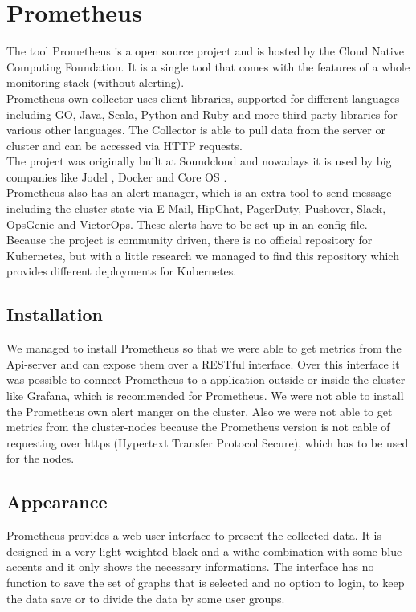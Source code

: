 \section{Prometheus}
\label{Prometheus} %
The tool Prometheus is a open source project and is hosted by the Cloud Native Computing Foundation.
It is a single tool that comes with the features of a whole monitoring stack (without alerting).\\ Prometheus own collector uses client libraries, supported for different languages including GO, Java, Scala, Python and Ruby and more third-party libraries for various other languages. The Collector is able to pull data from the server or cluster and can be accessed via HTTP requests.\\
The project was originally built at Soundcloud and nowadays it is used by big companies like Jodel \cite{jodel}, Docker and Core OS \cite{prometeus}. \\
Prometheus also has an alert manager, which is an extra tool to send message including the cluster state via E-Mail, HipChat, PagerDuty, Pushover, Slack, OpsGenie and VictorOps. These alerts have to be set up in an config file. \\
Because the project is community driven, there is no official repository for Kubernetes, but with a little research we managed to find this repository \cite{prometheus_kube} which provides different deployments for Kubernetes.

\subsection{Installation}
We managed to install Prometheus so that we were able to get metrics from the Api-server and can expose them over a RESTful interface. Over this interface it was possible to connect Prometheus to a application outside or inside the cluster like Grafana, which is recommended for Prometheus. We were not able to install the Prometheus own alert manger on the cluster. Also we were not able to get metrics from the cluster-nodes because the Prometheus version is not cable of requesting over https (Hypertext Transfer Protocol Secure), which has to be used for the nodes. 
\subsection{Appearance}%
Prometheus provides a web user interface to present the collected data. It is designed in a very light weighted black and a withe combination with some blue accents and it only shows the necessary informations. The interface has no function to save the set of graphs that is selected and no option to login, to keep the data save or to divide the data by some user groups.   
